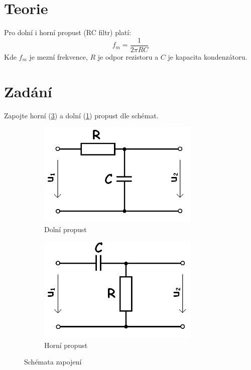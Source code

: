 \documentclass[12pt,a4paper]{article}
\begin{document}



\section*{Teorie}
Pro dolní i horní propust (RC filtr) platí: 
\begin{equation}
	\label{eq}
	f_m = \frac{1}{2\pi R C }
\end{equation}
Kde $f_m$ je mezní frekvence, $R$ je odpor rezistoru a  $C$ je kapacita kondenzátoru.

\section*{Zadání}
Zapojte horní (\ref{fig:HP}) a dolní (\ref{fig:LP}) propust dle schémat.
\begin{figure}[H]
	\centering
	\begin{subfigure}[b]{0.42\textwidth}
		\centering
		\includegraphics[width=0.85\textwidth]{../../propust/dolniP.png}
		\caption{Dolní propust}
		\label{fig:LP}
	\end{subfigure}
	\hfill
	\begin{subfigure}[b]{0.42\textwidth}
		\centering
		\includegraphics[width=0.85\textwidth]{../../propust/Horni_propust.png}
		\caption{Horní propust}
		\label{fig:HP}
	\end{subfigure}
	\caption{Schémata zapojení}
\end{figure}
\end{document}
